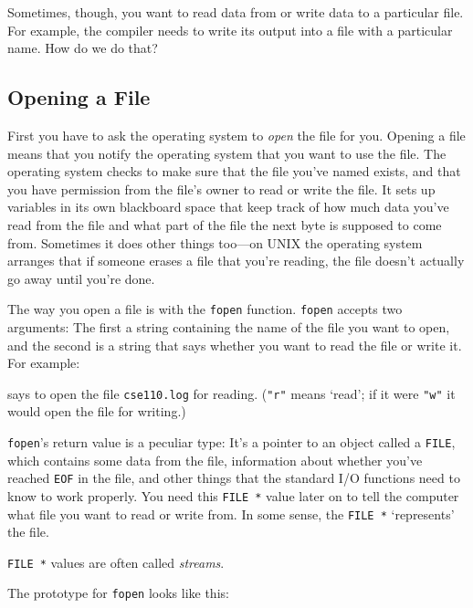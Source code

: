Sometimes, though, you want to read data from or write data to a
particular file.  For example, the compiler needs to write its output
into a file with a particular name.  How do we do that?

\subsection{Opening a File}

First you have to ask the operating system to {\em open} the file for
you.  Opening a file means that you notify the operating system that you
want to use the file.  The operating system checks to make sure that the
file you've named exists, and that you have permission from the file's
owner to read or write the file.  It sets up variables in its own
blackboard space that keep track of how much data you've read from the
file and what part of the file the next byte is supposed to come from.
Sometimes it does other things too---on {\sc UNIX} the operating system
arranges that if someone erases a file that you're reading, the file
doesn't actually go away until you're done.

The way you open a file is with the {\tt fopen} function.  {\tt fopen}
accepts two arguments:  The first a string containing the name of the
file you want to open, and the second is a string that says whether you
want to read the file or write it.  For example:

\begin{flushleft}
\verb% fopen("cse110.log", "r"); % 
\end{flushleft}

\noindent says to open the file {\tt cse110.log} for reading.  ({\tt "r"}
means `read'; if it were {\tt "w"} it would open the file for writing.)

{\tt fopen}'s return value is a peculiar type: It's a pointer to an
object called a {\tt FILE}, which contains some data from the file,
information about whether you've reached {\tt EOF} in the file, and
other things that the standard I/O functions need to know to work
properly. You need this {\tt FILE *} value later on to tell the computer
what file you want to read or write from.  In some sense, the {\tt FILE
*} `represents' the file.

{\tt FILE *} values are often called {\em streams}\/.

The prototype for {\tt fopen} looks like this:

\begin{flushleft}
\verb% FILE * fopen(char *filename, char *type); % \\*
\end{flushleft}

